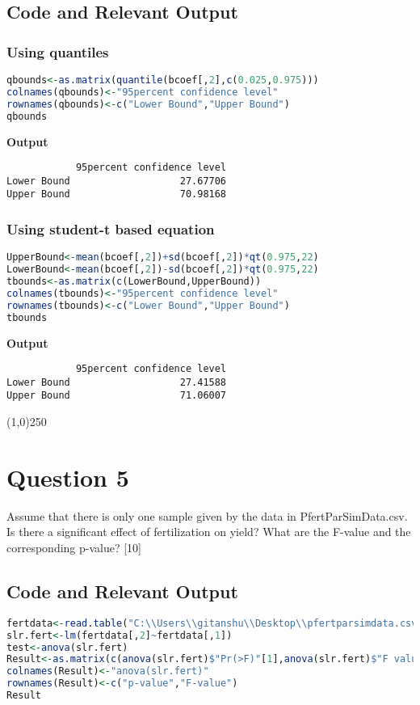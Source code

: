 \documentclass[a4paper]{article}
\begin{document}
\subsection{Code and Relevant Output}
\subsubsection {Using quantiles}
\begin{lstlisting}[language=R]
qbounds<-as.matrix(quantile(bcoef[,2],c(0.025,0.975)))
colnames(qbounds)<-"95percent confidence level"
rownames(qbounds)<-c("Lower Bound","Upper Bound")
qbounds
\end{lstlisting}
\textbf{Output}

\begin{lstlisting}
            95percent confidence level
Lower Bound         	      27.67706
Upper Bound           	      70.98168
\end{lstlisting}



\subsubsection{Using student-t based equation}
\begin{lstlisting}[language=R]
UpperBound<-mean(bcoef[,2])+sd(bcoef[,2])*qt(0.975,22)
LowerBound<-mean(bcoef[,2])-sd(bcoef[,2])*qt(0.975,22)
tbounds<-as.matrix(c(LowerBound,UpperBound))
colnames(tbounds)<-"95percent confidence level"
rownames(tbounds)<-c("Lower Bound","Upper Bound")
tbounds
\end{lstlisting}
\textbf{Output}

\begin{lstlisting}
            95percent confidence level
Lower Bound          	      27.41588
Upper Bound         	      71.06007

\end{lstlisting}
\begin{center}
\line(1,0){250}
\end{center}
\pagebreak
\section{Question 5}
Assume that there is only one sample given by the data in PfertParSimData.csv. Is there a significant effect of fertilization on yield? What are the F-value and the corresponding  p-value? [10]

\subsection{Code and Relevant Output}
\begin{lstlisting}[language=R]
fertdata<-read.table("C:\\Users\\gitanshu\\Desktop\\pfertparsimdata.csv",header=T,sep=",")
slr.fert<-lm(fertdata[,2]~fertdata[,1])
test<-anova(slr.fert)
Result<-as.matrix(c(anova(slr.fert)$"Pr(>F)"[1],anova(slr.fert)$"F value"[1]))
colnames(Result)<-"anova(slr.fert)"
rownames(Result)<-c("p-value","F-value")
Result
\end{lstlisting}
\end{document}
